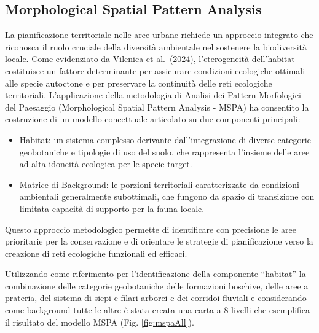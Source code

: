 \documentclass[
]{book}
\begin{document}
\subsection{Morphological Spatial Pattern Analysis}\label{morphological-spatial-pattern-analysis-1}

La pianificazione territoriale nelle aree urbane richiede un approccio integrato che riconosca il ruolo cruciale della diversità ambientale nel sostenere la biodiversità locale.
Come evidenziato da Vilenica et al.~(2024), l'eterogeneità dell'habitat costituisce un fattore determinante per assicurare condizioni ecologiche ottimali alle specie autoctone e per preservare la continuità delle reti ecologiche territoriali.
L'applicazione della metodologia di Analisi dei Pattern Morfologici del Paesaggio (Morphological Spatial Pattern Analysis - MSPA) ha consentito la costruzione di un modello concettuale articolato su due componenti principali:

\begin{itemize}
\item
  Habitat: un sistema complesso derivante dall'integrazione di diverse categorie geobotaniche e tipologie di uso del suolo, che rappresenta l'insieme delle aree ad alta idoneità ecologica per le specie target.
\item
  Matrice di Background: le porzioni territoriali caratterizzate da condizioni ambientali generalmente subottimali, che fungono da spazio di transizione con limitata capacità di supporto per la fauna locale.
\end{itemize}

Questo approccio metodologico permette di identificare con precisione le aree prioritarie per la conservazione e di orientare le strategie di pianificazione verso la creazione di reti ecologiche funzionali ed efficaci.

Utilizzando come riferimento per l'identificazione della componente ``habitat'' la combinazione delle categorie geobotaniche delle formazioni boschive, delle aree a prateria, del sistema di siepi e filari arborei e dei corridoi fluviali e considerando come background tutte le altre è stata creata una carta a 8 livelli che esemplifica il risultato del modello MSPA (Fig. \ref{fig:mspaAll}).
\end{document}

